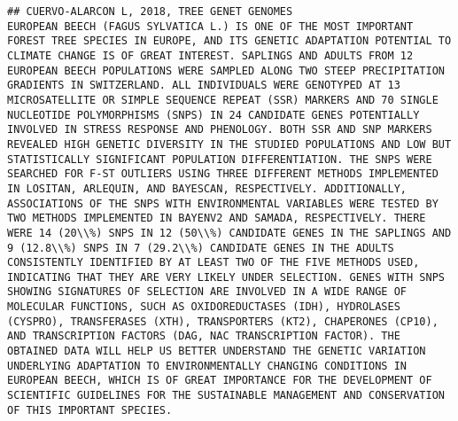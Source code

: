 \documentclass[]{article}
\begin{document}
\begin{verbatim}
## CUERVO-ALARCON L, 2018, TREE GENET GENOMES                                                                                                                                                                                                                                                                                                                                                                                                                                                       EUROPEAN BEECH (FAGUS SYLVATICA L.) IS ONE OF THE MOST IMPORTANT FOREST TREE SPECIES IN EUROPE, AND ITS GENETIC ADAPTATION POTENTIAL TO CLIMATE CHANGE IS OF GREAT INTEREST. SAPLINGS AND ADULTS FROM 12 EUROPEAN BEECH POPULATIONS WERE SAMPLED ALONG TWO STEEP PRECIPITATION GRADIENTS IN SWITZERLAND. ALL INDIVIDUALS WERE GENOTYPED AT 13 MICROSATELLITE OR SIMPLE SEQUENCE REPEAT (SSR) MARKERS AND 70 SINGLE NUCLEOTIDE POLYMORPHISMS (SNPS) IN 24 CANDIDATE GENES POTENTIALLY INVOLVED IN STRESS RESPONSE AND PHENOLOGY. BOTH SSR AND SNP MARKERS REVEALED HIGH GENETIC DIVERSITY IN THE STUDIED POPULATIONS AND LOW BUT STATISTICALLY SIGNIFICANT POPULATION DIFFERENTIATION. THE SNPS WERE SEARCHED FOR F-ST OUTLIERS USING THREE DIFFERENT METHODS IMPLEMENTED IN LOSITAN, ARLEQUIN, AND BAYESCAN, RESPECTIVELY. ADDITIONALLY, ASSOCIATIONS OF THE SNPS WITH ENVIRONMENTAL VARIABLES WERE TESTED BY TWO METHODS IMPLEMENTED IN BAYENV2 AND SAMADA, RESPECTIVELY. THERE WERE 14 (20\\%) SNPS IN 12 (50\\%) CANDIDATE GENES IN THE SAPLINGS AND 9 (12.8\\%) SNPS IN 7 (29.2\\%) CANDIDATE GENES IN THE ADULTS CONSISTENTLY IDENTIFIED BY AT LEAST TWO OF THE FIVE METHODS USED, INDICATING THAT THEY ARE VERY LIKELY UNDER SELECTION. GENES WITH SNPS SHOWING SIGNATURES OF SELECTION ARE INVOLVED IN A WIDE RANGE OF MOLECULAR FUNCTIONS, SUCH AS OXIDOREDUCTASES (IDH), HYDROLASES (CYSPRO), TRANSFERASES (XTH), TRANSPORTERS (KT2), CHAPERONES (CP10), AND TRANSCRIPTION FACTORS (DAG, NAC TRANSCRIPTION FACTOR). THE OBTAINED DATA WILL HELP US BETTER UNDERSTAND THE GENETIC VARIATION UNDERLYING ADAPTATION TO ENVIRONMENTALLY CHANGING CONDITIONS IN EUROPEAN BEECH, WHICH IS OF GREAT IMPORTANCE FOR THE DEVELOPMENT OF SCIENTIFIC GUIDELINES FOR THE SUSTAINABLE MANAGEMENT AND CONSERVATION OF THIS IMPORTANT SPECIES.

\end{verbatim}
\end{document}

